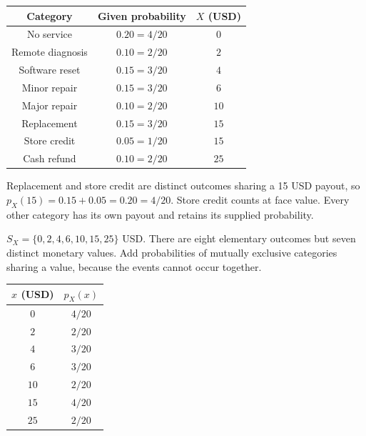\begin{center}
\begin{tabular}{ccc}\toprule
Category & Given probability & $X$ (USD)\\\midrule
No service & $0.20=4/20$ & $0$\\
Remote diagnosis & $0.10=2/20$ & $2$\\
Software reset & $0.15=3/20$ & $4$\\
Minor repair & $0.15=3/20$ & $6$\\
Major repair & $0.10=2/20$ & $10$\\
Replacement & $0.15=3/20$ & $15$\\
Store credit & $0.05=1/20$ & $15$\\
Cash refund & $0.10=2/20$ & $25$\\
\bottomrule\end{tabular}
\end{center}


Replacement and store credit are distinct outcomes sharing a 15 USD payout, so $p_X(15)=0.15+0.05=0.20=4/20$. Store credit counts at face value. Every other category has its own payout and retains its supplied probability.

$S_X=\{0,2,4,6,10,15,25\}$ USD. There are eight elementary outcomes but seven distinct monetary values. Add probabilities of mutually exclusive categories sharing a value, because the events cannot occur together.

\begin{center}
\begin{tabular}{cc}\toprule
$x$ (USD) & $p_X(x)$\\\midrule
$0$ & $4/20$\\
$2$ & $2/20$\\
$4$ & $3/20$\\
$6$ & $3/20$\\
$10$ & $2/20$\\
$15$ & $4/20$\\
$25$ & $2/20$\\
\bottomrule\end{tabular}
\end{center}


\begin{center}\end{center}

